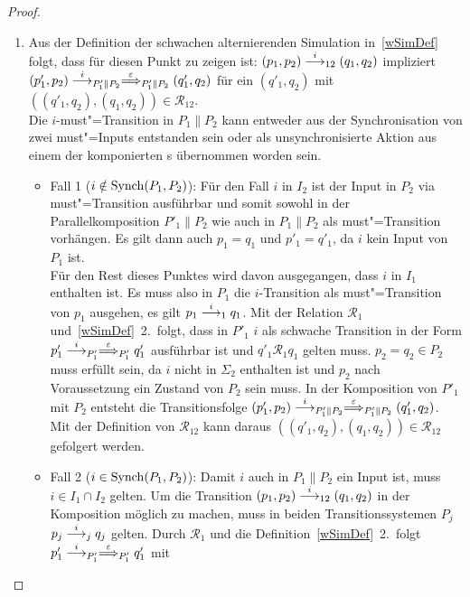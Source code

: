 \begin{proof}
\begin{enumerate}
    \item Aus der Definition der schwachen alternierenden
      Simulation in~\ref{wSimDef} folgt, dass für diesen Punkt zu zeigen ist:
      $(p_1,p_2)\must[i]_{12}(q_1,q_2)$ impliziert $(p'_1,p_2)
      \must[i]_{P'_1\|P_2} \weakmust[\varepsilon]_{P'_1\|P_2} (q'_1,q_2)$
      für ein $(q'_1,q_2)$ mit $((q'_1,q_2),(q_1,q_2)) \in \mathcal{R}_{12}$.\\
      Die $i$-must"=Transition in $P_1\|P_2$ kann entweder aus der
      Synchronisation von zwei must"=Inputs entstanden sein oder als
      unsynchronisierte Aktion aus einem der komponierten \MEIO{}s übernommen
      worden sein.
      \begin{itemize}
        \item Fall 1 ($i\notin\mathrm{Synch} (P_1,P_2)$): Für den Fall $i$ in $I_2$ ist
          der Input in $P_2$ via must"=Transition ausführbar und somit sowohl
          in der Parallelkomposition $P'_1\|P_2$ wie auch in $P_1\|P_2$ als
          must"=Transition vorhängen. Es gilt dann auch $p_1=q_1$ und
          $p'_1=q'_1$, da $i$ kein Input von $P_1$ ist.\\
          Für den Rest dieses Punktes wird davon ausgegangen, dass $i$ in $I_1$
          enthalten ist. Es muss also in $P_1$ die $i$-Transition als
          must"=Transition von $p_1$ ausgehen, es gilt $p_1\must[i]_1 q_1$. Mit
          der Relation $\mathcal{R}_1$ und~\ref{wSimDef}~2.\ folgt, dass in
          $P'_1$ $i$ als schwache Transition in der Form $p'_1\must[i]_{P'_1}
          \weakmust[\varepsilon]_{P'_1}q'_1$ ausführbar ist und $q'_1
          \mathcal{R}_1q_1$ gelten muss. $p_2=q_2 \in P_2$ muss erfüllt sein,
          da $i$ nicht in $\Sigma _2$ enthalten ist und $p_2$ nach
          Voraussetzung ein Zustand von $P_2$ sein muss. In der Komposition von
          $P'_1$ mit $P_2$ entsteht die Transitionsfolge $(p'_1,p_2)
          \must[i]_{P'_1\|P_2} \weakmust[\varepsilon]_{P'_1\|P_2} (q'_1,q_2)$.
          Mit der Definition von $\mathcal{R}_{12}$ kann daraus
          $((q'_1,q_2),(q_1,q_2)) \in \mathcal{R}_{12}$ gefolgert werden.
        \item Fall 2 ($i\in\mathrm{Synch} (P_1,P_2)$): Damit $i$ auch in $P_1\|P_2$
          ein Input ist, muss $i\in I_1\cap I_2$ gelten. Um die Transition
          $(p_1,p_2)\must[i]_{12}(q_1,q_2)$ in der Komposition möglich zu
          machen, muss in beiden Transitionssystemen $P_j$ $p_j\must[i]_j q_j$
          gelten. Durch $\mathcal{R}_1$ und die Definition~\ref{wSimDef}~2.\
          folgt $p'_1\must[i]_{P'_1} \weakmust[\varepsilon]_{P'_1}q'_1$ mit

\end{itemize}
\end{enumerate}
\end{proof}
